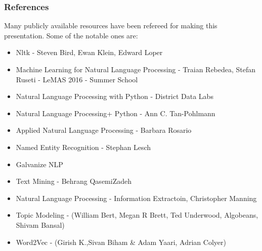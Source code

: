 \begin{frame}\frametitle{References}
Many publicly available resources have been refereed for making this presentation. Some of the notable ones are:
\footnotesize
\begin{itemize}
\item Nltk - Steven Bird, Ewan Klein, Edward Loper
\item Machine Learning for Natural Language Processing - Traian Rebedea, Stefan Ruseti - LeMAS 2016 - Summer School
\item Natural Language Processing with Python - District Data Labs
\item Natural Language Processing+ Python - Ann C. Tan-Pohlmann
\item Applied Natural Language Processing - Barbara Rosario
\item Named Entity Recognition - Stephan Lesch
\item Galvanize NLP
\item Text Mining - Behrang QasemiZadeh
\item Natural Language Processing - Information Extractoin, Christopher Manning
\item Topic Modeling - (William Bert,  Megan R Brett,  Ted Underwood, Algobeans, Shivam Bansal)
\item Word2Vec - (Girish K.,Sivan Biham \& Adam Yaari, Adrian Colyer)
\end{itemize}
\end{frame}
